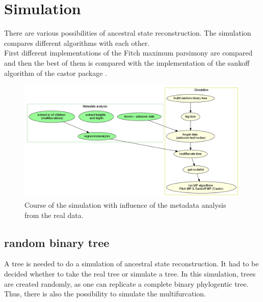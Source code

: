   \section{Simulation}\label{sec:simulation}
    There are various possibilities of ancestral state reconstruction. The simulation compares
      different algorithms with each other. \\
    First different implementations of the Fitch maximum parsimony are compared and then the best of 
      them is compared with the implementation of the sankoff algorithm of the castor package 
      \cite{Louca2017}. \\

    \begin{figure}[h!]
      \centering
      \includegraphics[width=1\textwidth]{Figures/Workflow-Simulation.png}
      \caption{Course of the simulation with influence of the metadata analysis from the real data.}
      \label{fig:Simulation Workflow}
    \end{figure}



    \subsection{random binary tree}
      A tree is needed to do a simulation of ancestral state reconstruction. It had to be decided whether 
        to take the real tree or simulate a tree. In this simulation, trees are created randomly, as 
        one can replicate a complete binary phylogentic tree. Thus, there is also the possibility to 
        simulate the multifurcation. \\
      
